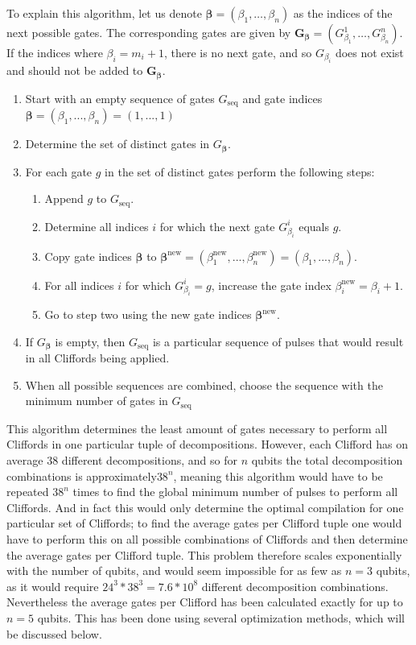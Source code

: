     To explain this algorithm, let us denote $\bm{\beta}=\left(\beta_1, \dots, \beta_n\right)$ as the indices of the next possible gates. The corresponding gates are given by $\bm{G_\bm{\beta}}=\left( G_{\beta_1}^1, \dots, G_{\beta_n}^n \right)$. If the indices where $\beta_i=m_i + 1$, there is no next gate, and so $G_{\beta_i}$ does not exist and should not be added to $\bm{G_\bm{\beta}}$.

    \begin{enumerate}
      \item Start with an empty sequence of gates $G_\text{seq}$ and gate indices $\bm{\beta} = \left(\beta_1, ..., \beta_n\right) = \left(1, ..., 1\right)$
      \item Determine the set of distinct gates in $G_{\bm{\beta}}$.
      \item For each gate $g$ in the set of distinct gates perform the following steps:
      \begin{enumerate}
        \item Append $g$ to $G_\text{seq}$.
        \item Determine all indices $i$ for which the next gate $G_{\beta_i}^i$ equals $g$.
        \item Copy gate indices $\bm{\beta}$ to $\bm{\beta}^\text{new}=\left(\beta_1^\text{new}, ..., \beta_n^\text{new}\right)=\left(\beta_1, ..., \beta_n\right)$.
        \item For all indices $i$ for which $G_{\beta_i}^i=g$, increase the gate index $\beta_i^\text{new} = \beta_i+1$.
        \item Go to step two using the new gate indices $\bm{\beta}^\text{new}$.
      \end{enumerate}
      \item If $G_{\bm{\beta}}$ is empty, then $G_\text{seq}$ is a particular sequence of pulses that would result in all Cliffords being applied.
      \item When all possible sequences are combined, choose the sequence with the minimum number of gates in $G_\text{seq}$
    \end{enumerate}

    This algorithm determines the least amount of gates necessary to perform all Cliffords in one particular tuple of decompositions. However, each Clifford has on average $38$ different decompositions, and so for $n$ qubits the total decomposition combinations is approximately$38^n$, meaning this algorithm would have to be repeated $38^n$ times to find the global minimum number of pulses to perform all Cliffords. And in fact this would only determine the optimal compilation for one particular set of Cliffords; to find the average gates per Clifford tuple one would have to perform this on all possible combinations of Cliffords and then determine the average gates per Clifford tuple. This problem therefore scales exponentially with the number of qubits, and would seem impossible for as few as $n=3$ qubits, as it would require $24^3*38^3=7.6*10^8$ different decomposition combinations. Nevertheless the average gates per Clifford has been calculated exactly for up to $n=5$ qubits. This has been done using several optimization methods, which will be discussed below.

